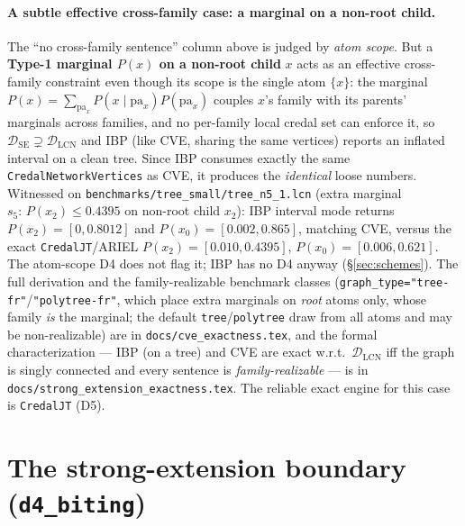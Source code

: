 \documentclass[11pt]{article}
\newcommand{\DSE}{\mathcal{D}_{\mathrm{SE}}}
\newcommand{\DLCN}{\mathcal{D}_{\mathrm{LCN}}}
\begin{document}
\paragraph{A subtle effective cross-family case: a marginal on a non-root child.} The ``no
cross-family sentence'' column above is judged by \emph{atom scope}. But a \textbf{Type-1 marginal
$P(x)$ on a non-root child} $x$ acts as an effective cross-family constraint even though its scope is
the single atom $\{x\}$: the marginal $P(x)=\sum_{\mathrm{pa}_x}P(x\mid\mathrm{pa}_x)P(\mathrm{pa}_x)$
couples $x$'s family with its parents' marginals across families, and no per-family local credal set
can enforce it, so $\DSE\supsetneq\DLCN$ and IBP (like CVE, sharing the same vertices) reports an
inflated interval on a clean tree. Since IBP consumes exactly the same
\texttt{CredalNetworkVertices} as CVE, it produces the \emph{identical} loose numbers. Witnessed on
\texttt{benchmarks/tree\_small/tree\_n5\_1.lcn} (extra marginal $s_5:\,P(x_2)\le0.4395$ on non-root
child $x_2$): IBP interval mode returns $P(x_2)=[0,0.8012]$ and $P(x_0)=[0.002,0.865]$, matching CVE,
versus the exact \texttt{CredalJT}/ARIEL $P(x_2)=[0.010,0.4395]$, $P(x_0)=[0.006,0.621]$. The
atom-scope D4 does not flag it; IBP has no D4 anyway (\S\ref{sec:schemes}). The full derivation and
the family-realizable benchmark classes (\texttt{graph\_type="tree-fr"}/\texttt{"polytree-fr"}, which
place extra marginals on \emph{root} atoms only, whose family \emph{is} the marginal; the default
\texttt{tree}/\texttt{polytree} draw from all atoms and may be non-realizable) are in
\texttt{docs/cve\_exactness.tex}, and the formal characterization --- IBP (on a tree) and CVE are
exact w.r.t.\ $\DLCN$ iff the graph is singly connected and every sentence is
\emph{family-realizable} --- is in \texttt{docs/strong\_extension\_exactness.tex}. The reliable exact
engine for this case is \texttt{CredalJT} (D5).

\section{The strong-extension boundary (\texttt{d4\_biting})}\label{sec:boundary}
\end{document}
